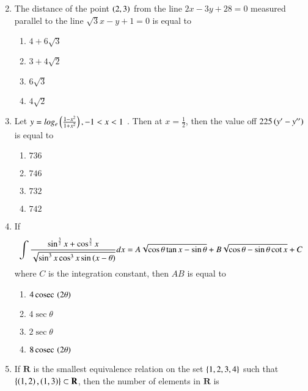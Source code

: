 \documentclass[journal]{IEEEtran}
\begin{document}
\begin{enumerate}
\begin{multicols}{2}
	\end{multicols}
\item The distance of the point $\left( 2 , 3 \right)$ from the line $2x - 3y + 28 =0 $ measured parallel to the line $\sqrt{3}x - y + 1 = 0$ is equal to
	\begin{multicols}{2}
		\begin{enumerate}
			\item $ 4 + 6\sqrt{3}$
			\item $ 3 + 4\sqrt{2}$
			\item $6\sqrt{3}$
			\item $4\sqrt{2}$
		\end{enumerate}
	\end{multicols}
\item Let $ y = log_e \left(\frac{1 - x^2}{1 + x^2}\right) , -1 < x < 1$ . Then at $x = \frac{1}{2}$, then the value off $225\left(y^\prime - y^{\prime\prime}\right)$ is equal to 
	\begin{multicols}{2}
		\begin{enumerate}
			\item $736$
			\item $746$
			\item $732$
			\item $742$
		\end{enumerate}
	\end{multicols}
\item If 
	\begin{align}
		\int \frac{ \sin^{\frac{3}{2}}x + \cos^{\frac{3}{2}}x}{\sqrt{ \sin^3x \cos^3 x \sin \left(x - \theta\right)}} dx = A \sqrt{\cos\theta \tan x - \sin \theta} + B \sqrt{ \cos \theta - \sin \theta \cot x} + C 
	\end{align}
	where $C$ is the integration constant, then $AB$ is equal to
	\begin{multicols}{2}
		\begin{enumerate}
			\item $4 \,\text{cosec}\,\left(2\theta\right)$
			\item $4 \sec{\theta}$
			\item $2 \sec{\theta}$
			\item $8 \,\text{cosec}\,\left(2\theta\right)$
		\end{enumerate}
	\end{multicols}
\item If $\mathbf{R}$ is the smallest equivalence relation on the set $\left\{ 1,2 ,3 ,4\right\}$ such that $\left\{\left(1,2\right),\left(1,3\right)\right\} \subset \mathbf{R}$, then the number of elements in $\mathbf{R}$ is 
	\begin{multicols}{2}

\end{multicols}
\end{enumerate}
\end{document}
